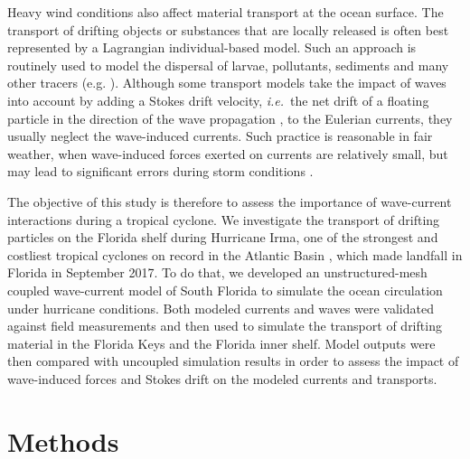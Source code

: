 \documentclass[preprint,12pt,authoryear]{elsarticle}
\newcommand{\ie}{{\it i.e.}\ }
\begin{document}
Heavy wind conditions also affect material transport at the ocean surface. The transport of drifting objects or substances that are locally released is often best represented by a Lagrangian individual-based model. Such an approach is routinely used to model the dispersal of larvae, pollutants, sediments and many other tracers (e.g. \citealp{le2012surface,liubartseva2018tracking, figueiredo2013synthesizing,frys2020fine}). Although some transport models take the impact of waves into account by adding a Stokes drift velocity, \ie the net drift of a floating particle in the direction of the wave propagation \citep{van2018stokes}, to the Eulerian currents, they usually neglect the wave-induced currents. Such practice is reasonable in fair weather, when wave-induced forces exerted on currents are relatively small, but may lead to significant errors during storm conditions \citep{rohrs2012observation,curcic2016hurricane}. 

The objective of this study is therefore to assess the importance of wave-current interactions during a tropical cyclone. We investigate the transport of drifting particles on the Florida shelf during Hurricane Irma, one of the strongest and costliest tropical cyclones on record in the Atlantic Basin \citep{xian2018brief}, which made landfall in Florida in September 2017. To do that, we developed an unstructured-mesh coupled wave-current model of South Florida to simulate the ocean circulation under hurricane conditions. Both modeled currents and waves were validated against field measurements and then used to simulate the transport of drifting material in the Florida Keys and the Florida inner shelf. Model outputs were then compared with uncoupled simulation results in order to assess the impact of wave-induced forces and Stokes drift on the modeled currents and transports.  

\section{Methods}
\end{document}

